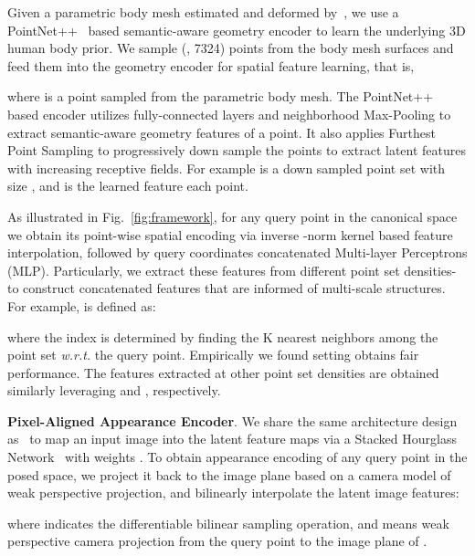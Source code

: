 \documentclass[10pt,twocolumn,letterpaper]{article}
\begin{document}
Given a parametric body mesh estimated and deformed by~\cite{DenseRaCICCV19, huang2020arch}, we use a PointNet++~\cite{qi2017pointnet,qi2017pointnet++} based semantic-aware geometry encoder to learn the underlying 3D human body prior.
We sample  (\eg, 7324) points from the body mesh surfaces and feed them into
the geometry encoder
for spatial feature learning, that is,

where  is a point sampled from the parametric body mesh. The PointNet++ based encoder utilizes fully-connected layers and neighborhood Max-Pooling to extract semantic-aware geometry features  of a point. It also applies Furthest Point Sampling to progressively down sample the points  to extract latent features with increasing receptive fields. For example  is a down sampled point set with size , and  is the learned feature \wrt each point.

As illustrated in Fig.~\ref{fig:framework}, for any query point  in the canonical space we obtain its point-wise spatial encoding 
via inverse -norm kernel based feature interpolation, followed by query coordinates concatenated Multi-layer Perceptrons (MLP).
Particularly, we extract these features from different point set densities- to construct concatenated features  that are informed of multi-scale structures. For example,  is defined as:

where the index  is determined by finding the K nearest neighbors among the point set  \textit{w.r.t.} the query point. Empirically we found setting  obtains fair performance. The features extracted at other point set densities  are obtained similarly leveraging  and , respectively.

\textbf{Pixel-Aligned Appearance Encoder}. We share the same architecture design as~\cite{PIFuICCV19,saito2020pifuhd,huang2020arch,he2020geopifu} to map an input image  into the latent feature maps  via a Stacked Hourglass Network~\cite{newell2016stacked} with weights . To obtain appearance encoding  of any query point  in the posed space, we project it back to the image plane based on a camera model of weak perspective projection, and bilinearly interpolate the latent image features:

where  indicates the differentiable bilinear sampling operation, and  means weak perspective camera projection from the query point  to the image plane of .
\end{document}
